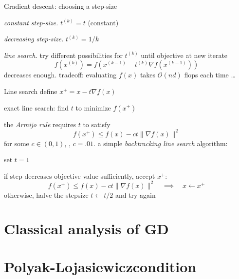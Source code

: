 \documentclass[presentation,xcolor={usenames,dvipsnames}]{beamer}
\newcommand{\pl}{Polyak-Lojasiewicz}
\begin{document}
\begin{frame}{Gradient descent: choosing a step-size}

\bit
\item \emph{constant step-size.} $t^{(k)} = t$ (constant)
\item \emph{decreasing step-size.} $t^{(k)} = 1/k$
\item \emph{line search.} try different possibilities for $t^{(k)}$
until objective at new iterate
\[
f(x^{(k)}) = f(x^{(k-1)} - t^{(k)} \nabla f(x^{(k-1)}))
\]
decreases enough.
\eit
tradeoff: evaluating $f(x)$ takes $\mathcal O(nd)$ flops each time \ldots
\end{frame}

\begin{frame}{Line search}
define $x^+ = x - t \nabla f(x)$

\bit
\item exact line search: find $t$ to minimize $f(x^+)$
\item the \emph{Armijo rule} requires $t$ to satisfy
\[
f(x^+) \leq f(x) - c t \|\nabla f(x)\|^2
\]
for some $c \in (0,1)$, \eg, $c = .01$.
\eit
\pause
a simple \emph{backtracking line search} algorithm:
\bit
\item set $t = 1$
\item if step decreases objective value sufficiently, accept $x^+$:
\[
f(x^+) \leq f(x) - c t \|\nabla f(x)\|^2 \quad \implies \quad x \leftarrow x^+
\]
otherwise, halve the stepsize $t \leftarrow t/2$ and try again
\eit
\vfill
{}

\end{frame}

\section{Classical analysis of GD}


\section{\pl condition}
\end{document}
